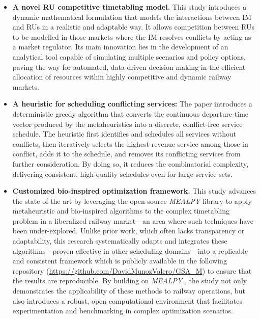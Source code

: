 \documentclass[Afour,sagev,times]{sagej}
\begin{document}
\begin{itemize}
  \item \textbf{A novel \gls{RU} competitive timetabling model.} This study introduces a dynamic mathematical formulation that models the interactions between \gls{IM} and \glspl{RU} in a realistic and adaptable way. It allows competition between \glspl{RU} to be modelled in those markets where the \gls{IM} resolves conflicts by acting as a market regulator.  Its main innovation lies in the development of an analytical tool capable of simulating multiple scenarios and policy options, paving the way for automated, data-driven decision making in the efficient allocation of resources within highly competitive and dynamic railway markets.

  \item \textbf{A heuristic for scheduling conflicting services: } The paper introduces a deterministic greedy algorithm that converts the continuous departure‐time vector produced by the metaheuristics into a discrete, conflict‐free service schedule. The heuristic first identifies and schedules all services without conflicts, then iteratively selects the highest‐revenue service among those in conflict, adds it to the schedule, and removes its conflicting services from further consideration. By doing so, it reduces the combinatorial complexity, delivering consistent, high‐quality schedules even for large service sets.
  

  \item \textbf{Customized bio-inspired optimization framework.} This study advances the state of the art by leveraging the open-source \textit{MEALPY} library to apply metaheuristic and bio-inspired algorithms to the complex timetabling problem in a liberalized railway market—an area where such techniques have been under-explored. Unlike prior work, which often lacks transparency or adaptability, this research systematically adapts and integrates these algorithms—proven effective in other scheduling domains—into a replicable and consistent framework which is publicly available in the following repository (\url{https://github.com/DavidMunozValero/GSA_M}) to ensure that the results are reproducible. By building on \textit{MEALPY} \cite{Vanthieu2023,Vanthieu2023b}, the study not only demonstrates the applicability of these methods to railway operations, but also introduces a robust, open computational environment that facilitates experimentation and benchmarking in complex optimization scenarios.
  

\end{itemize}
\end{document}
